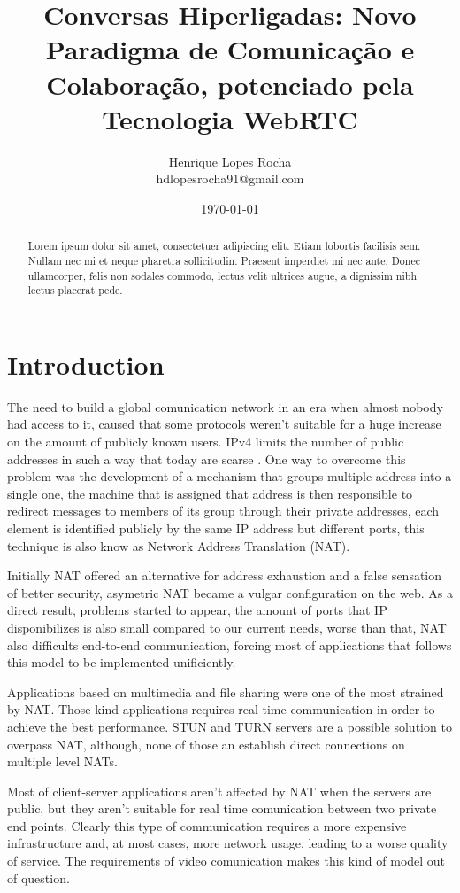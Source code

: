 \documentclass[11pt,twocolumn]{article}
\title{Conversas Hiperligadas: Novo Paradigma de Comunicação e Colaboração, potenciado pela Tecnologia WebRTC}
\author{
	Henrique Lopes Rocha \\ hdlopesrocha91@gmail.com
}
\date{\today}
\begin{document}
\begingroup
\let\onecolumn\twocolumn

	\maketitle


\begin{abstract}
Lorem ipsum dolor sit amet, consectetuer adipiscing elit. Etiam lobortis facilisis sem. Nullam nec mi et neque pharetra sollicitudin. Praesent imperdiet mi nec ante. Donec ullamcorper, felis non sodales commodo, lectus velit ultrices augue, a dignissim nibh lectus placerat pede.
\end{abstract}

\endgroup


\section{Introduction}
The need to build a global comunication network in an era when almost nobody had access to it, caused that some protocols weren't suitable for a huge increase on the amount of publicly known users. IPv4 limits the number of public addresses in such a way that today are scarse \cite{ipv4}. One way to overcome this problem was the development of a mechanism that groups multiple address into a single one, the machine that is assigned that address is then responsible to redirect messages to members of its group through their private addresses, each element is identified publicly by the same IP address but different ports, this technique is also know as Network Address Translation (NAT).

Initially NAT offered an alternative for address exhaustion and a false sensation of better security, asymetric NAT became a vulgar configuration on the web. As a direct result, problems started to appear, the amount of ports that IP disponibilizes is also small compared to our current needs, worse than that, NAT also difficults end-to-end communication, forcing most of applications that follows this model to be implemented unificiently.

Applications based on multimedia and file sharing were one of the most strained by NAT. Those kind applications requires real time communication in order to achieve the best performance. STUN and TURN \cite{natvoip} servers are a possible solution to overpass NAT, although, none of those an establish direct connections on multiple level NATs.

Most of client-server applications aren't affected by NAT when the servers are public, but they aren't suitable for real time comunication between two private end points. Clearly this type of communication requires a more expensive infrastructure and, at most cases, more network usage, leading to a worse quality of service. The requirements of video comunication makes this kind of model out of question.
\end{document}
